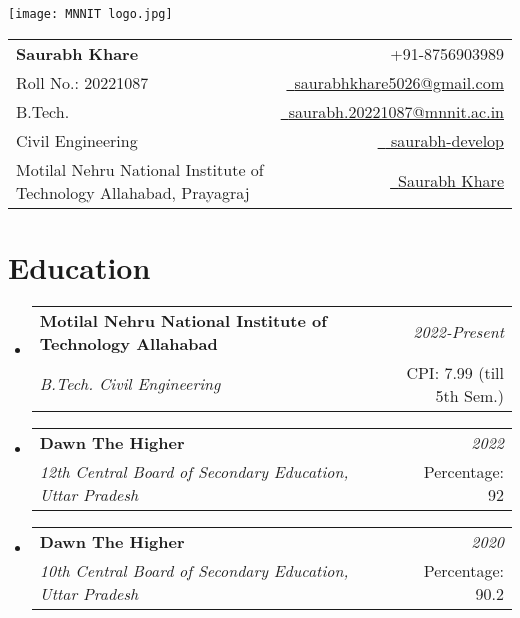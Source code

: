 \documentclass[a4paper,11pt]{article}
\makeatletter
\newcommand{\resumeSubheading}[4]{
\vspace{0.5mm}\item
    \begin{tabular*}{0.98\textwidth}[t]{l@{\extracolsep{\fill}}r}
        \textbf{#1} & \textit{\footnotesize{#4}} \\
        \textit{\footnotesize{#3}} &  \footnotesize{#2}\\
    \end{tabular*}
    \vspace{-2.4mm}
}
\newcommand{\resumeSubHeadingListStart}{\begin{itemize}[leftmargin=*,labelsep=0mm]}
\newcommand{\resumeItemListStart}{\begin{justify}\begin{itemize}[leftmargin=3ex, rightmargin=2ex, noitemsep,labelsep=1.2mm,itemsep=0mm]\small}
\newcommand{\resumeSubHeadingListEnd}{\end{itemize}\vspace{2mm}}
\newcommand{\resumeItemListEnd}{\end{itemize}\end{justify}\vspace{-2mm}}
\newcommand{\name}{Saurabh Khare} %
\newcommand{\course}{B.Tech.} %
\newcommand{\roll}{20221087} %
\newcommand{\phone}{8756903989} %
\newcommand{\emaila}{saurabhkhare5026@gmail.com} %
\newcommand{\emailb}{saurabh.20221087@mnnit.ac.in} %
\makeatother
\begin{document}
\selectfont


\parbox{2.35cm}{%
\texttt{[image: MNNIT logo.jpg]}
}
\parbox{\dimexpr\linewidth-2.8cm\relax}{
\begin{tabularx}{\linewidth}{L r} \\
  \textbf{\Large \name} & {\raisebox{0.0\height}{\footnotesize \faPhone}\ +91-\phone}\\
  {Roll No.: \roll} & \href{mailto:\emaila}{\raisebox{0.0\height}{\footnotesize \faEnvelope}\ {\emaila}} \\
  \course &  \href{mailto:\emailb}{\raisebox{0.0\height}{\footnotesize \faEnvelope}\ {\emailb}}\\
  {Civil Engineering} &  \href{https://github.com/saurabh-develop}{\raisebox{0.0\height}{\footnotesize \faGithub}\ {
saurabh-develop}} \\
  {Motilal Nehru National Institute of Technology Allahabad, Prayagraj} & \href{https://www.linkedin.com/in/saurabh-khare5025/}{\raisebox{0.0\height}{\footnotesize \faLinkedin}\ {Saurabh Khare}}
\end{tabularx}
}




\section{\textbf{Education}}
  \resumeSubHeadingListStart
    \resumeSubheading
      {Motilal Nehru National Institute of Technology Allahabad}{CPI: 7.99 (till 5th Sem.)}
      {B.Tech. Civil Engineering}{2022-Present}
    \resumeSubheading
      {Dawn The Higher}{Percentage: 92}
      {12th Central Board of Secondary Education, Uttar Pradesh}{2022}
    \resumeSubheading
      {Dawn The Higher}{Percentage: 90.2}
      {10th Central Board of Secondary Education, Uttar Pradesh}{2020}
  \resumeSubHeadingListEnd
\vspace{-5.5mm}
%



    
\end{document}

